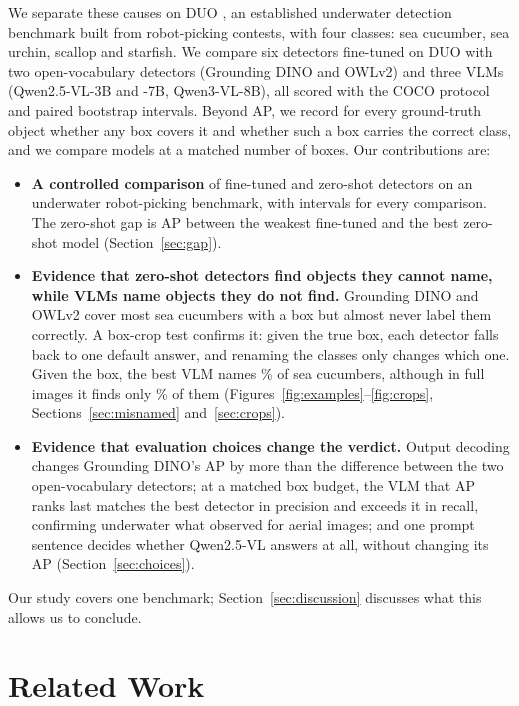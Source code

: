 \documentclass[letterpaper]{article} %
\begin{document}
We separate these causes on DUO \citep{liu2021duo}, an established underwater detection benchmark built from robot-picking contests, with four classes: sea cucumber, sea urchin, scallop and starfish. We compare six detectors fine-tuned on DUO with two open-vocabulary detectors (Grounding DINO and OWLv2) and three VLMs (Qwen2.5-VL-3B and -7B, Qwen3-VL-8B), all scored with the COCO protocol and paired bootstrap intervals. Beyond AP, we record for every ground-truth object whether any box covers it and whether such a box carries the correct class, and we compare models at a matched number of boxes. Our contributions are:
\begin{itemize}
\item \textbf{A controlled comparison} of fine-tuned and zero-shot detectors on an underwater robot-picking benchmark, with intervals for every comparison. The zero-shot gap is \dGap{} AP \dciGap{} between the weakest fine-tuned and the best zero-shot model (Section~\ref{sec:gap}).
\item \textbf{Evidence that zero-shot detectors find objects they cannot name, while VLMs name objects they do not find.} Grounding DINO and OWLv2 cover most sea cucumbers with a box but almost never label them correctly. A box-crop test confirms it: given the true box, each detector falls back to one default answer, and renaming the classes only changes which one. Given the box, the best VLM names \cropCucQwenVL\% of sea cucumbers, although in full images it finds only \scFoundQwenVL\% of them (Figures~\ref{fig:examples}--\ref{fig:crops}, Sections~\ref{sec:misnamed} and~\ref{sec:crops}).
\item \textbf{Evidence that evaluation choices change the verdict.} Output decoding changes Grounding DINO's AP by more than the difference between the two open-vocabulary detectors; at a matched box budget, the VLM that AP ranks last matches the best detector in precision and exceeds it in recall, confirming underwater what \citet{li2025aerialmlm} observed for aerial images; and one prompt sentence decides whether Qwen2.5-VL answers at all, without changing its AP (Section~\ref{sec:choices}).
\end{itemize}
Our study covers one benchmark; Section~\ref{sec:discussion} discusses what this allows us to conclude.

\section{Related Work}
\end{document}
